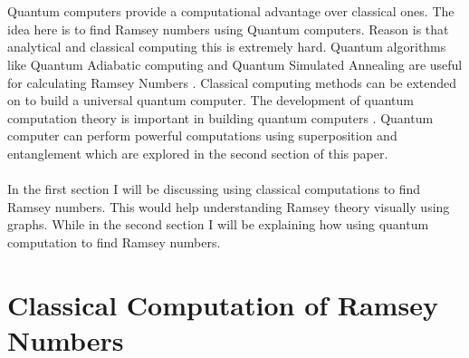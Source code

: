 \documentclass{Assignment}
\begin{document}
\\\\
Quantum computers provide a computational advantage over classical ones.
The idea here is to find Ramsey numbers using Quantum computers.
Reason is that analytical and classical computing this is extremely hard.
Quantum algorithms like Quantum Adiabatic computing and Quantum Simulated Annealing are useful for calculating Ramsey Numbers \cite{gaitan2012ramsey, PhysRevA.93.032301}.
Classical computing methods can be extended on to build a universal quantum computer.
The development of quantum computation theory is important in building quantum computers \cite{Deutsch1989}.
Quantum computer can perform powerful computations using superposition and entanglement which are explored in the second section of this paper.
\\\\
In the first section I will be discussing using classical computations to find Ramsey numbers. 
This would help understanding Ramsey theory visually using graphs.
While in the second section I will be explaining how using quantum computation to find Ramsey numbers.
\section{Classical Computation of Ramsey Numbers}
\end{document}
